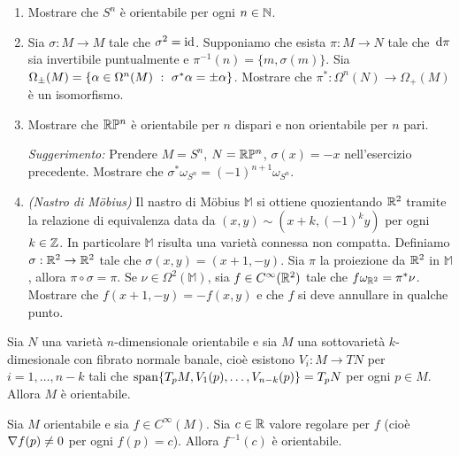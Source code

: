 \begin{exercise}
	\begin{enumerate}
		\item Mostrare che $S^n$ è orientabile per ogni $n\in\mathbb N$.
		
		\item Sia $\sigma:M\to M$ tale che $\sigma^2=\mathrm{id}$. Supponiamo che esista $\pi:M\to N$ tale che $\,\mathrm d \pi$ sia invertibile puntualmente e $\pi^{-1}(n) = \{m,\sigma(m)\}$. Sia $\Omega_\pm(M) = \{ \alpha\in\Omega^n(M) \ :\  \sigma^*\alpha = \pm\alpha \}$. Mostrare che $\pi^* : \Omega^n(N) \to \Omega_+(M)$ è un isomorfismo.
		
		\item Mostrare che $\mathbb R \mathbb P^n$ è orientabile per $n$ dispari e non orientabile per $n$ pari.
		
		\emph{Suggerimento:} Prendere $M=S^n$, $N=\mathbb R\mathbb P^n$, $\sigma(x)=-x$ nell'esercizio precedente. Mostrare che $\sigma^*\omega_{S^n} = (-1)^{n+1} \omega_{S^n}$.
		
		\item \emph{(Nastro di M\"{o}bius)} Il nastro di M\"{o}bius $\mathbb M$ si ottiene quozientando $\mathbb R^2$ tramite la relazione di equivalenza data da $(x,y) \sim (x+k,(-1)^ky)$ per ogni $k\in\mathbb Z$.  
		In particolare $\mathbb M$ risulta una varietà connessa non compatta. Definiamo $\sigma:\mathbb R^2\to\mathbb R^2$ tale che $\sigma(x,y) = (x+1,-y)$. Sia $\pi$ la proiezione da $\mathbb R^2$ in $\mathbb M$, allora $\pi\circ\sigma=\pi$.
		Se $\nu\in\Omega^2(\mathbb M)$, sia $f\in C^\infty(\mathbb R^2)$ tale che $f\omega_{\mathbb R^2} = \pi^*\nu$.
		Mostrare che $f(x+1,-y) = -f(x,y)$ e che $f$ si deve annullare in qualche punto.
	\end{enumerate}
\end{exercise}

\begin{proposition} 
	Sia $N$ una varietà $n$-dimensionale orientabile e sia $M$ una sottovarietà $k$-dimesionale con fibrato normale banale, cioè esistono $V_i:M\to TN$ per $i=1,\ldots,n-k$ tali che $\mathrm{span}\{ T_pM,V_1(p), \ldots, V_{n-k}(p) \} = T_pN$ per ogni $p\in M$.
	Allora $M$ è orientabile.
\end{proposition}

\begin{corollary}
	Sia $M$ orientabile e sia $f \in C^\infty(M)$. Sia $c\in\mathbb R$ valore regolare per $f$ (cioè $\nabla f (p)\not=0$ per ogni $f(p)=c$). Allora $f^{-1}(c)$ è orientabile. 
\end{corollary}

